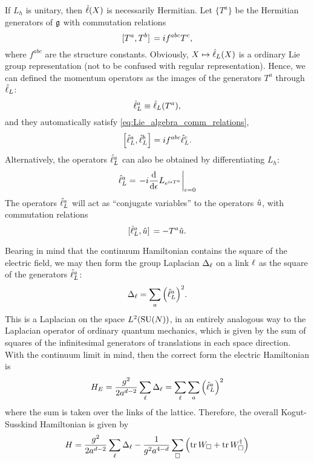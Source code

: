 If $L_h$ is unitary, then $\hat{\ell}(X)$ is necessarily Hermitian.
Let $\{T^a\}$ be the Hermitian generators of $\mathfrak{g}$ with commutation relations
\begin{equation}
    \comm*{T^a}{T^b} = i f^{abc} T^c,
    \label{eq:Lie_algebra_comm_relations}
\end{equation}
where $f^{abc}$ are the structure constants.
Obviously, $X \mapsto \hat{\ell}_L(X)$ is a ordinary Lie group representation (not to be confused with regular representation).
Hence, we can defined the momentum operators as the images of the generators $T^a$ through $\hat{\ell}_L$:
\begin{equation}
    \hat{\ell}^a_L \equiv \hat{\ell}_L(T^a),
\end{equation}
and they automatically satisfy \eqref{eq:Lie_algebra_comm_relations},
\begin{equation}
    \comm{\generator^a_L}{\generator^b_L} = i f^{abc} \generator^c_L.
\end{equation}
Alternatively, the operators $\hat{\ell}^a_L$ can also be obtained by differentiating $L_h$:
\begin{equation}
    \generator^a_L = \eval{-i \dv{\epsilon} L_{e^{i \epsilon T^a}}}_{\epsilon=0}
\end{equation}
The operators $\hat{\ell}^a_L$ will act as ``conjugate variables'' to the operators $\hat{u}$, with commutation relations
\begin{equation}
    \comm*{\generator_L^a}{\transport} = -T^a \transport.
\end{equation}

Bearing in mind that the continuum Hamiltonian contains the square of the electric field, we may then form the group Laplacian $\Delta_{\ell}$ on a link $\ell$ as the square of the generators $\hat{\ell}^a_L$:
\begin{equation}
    \Delta_{\ell} = \sum_{a} \qty( \hat{\ell}^a_L )^2.
\end{equation}
This is a Laplacian on the space $L^2(\text{SU}(N))$, in an entirely analogous way to the Laplacian operator of ordinary quantum mechanics, which is given by the sum of squares of the infinitesimal generators of translations in each space direction.
With the continuum limit in mind, then the correct form the electric Hamiltonian is
\begin{equation}
    H_E =
    \frac{g^2}{2 a^{d-2}} \sum_{\ell} \Delta_{\ell} =
    \sum_{\ell} \sum_{a} \qty( \hat{\ell}_L^a )^2
\end{equation}
where the sum is taken over the links of the lattice.
Therefore, the overall Kogut-Susskind Hamiltonian is given by
\begin{equation}
    H =
    \frac{g^2}{2 a^{d-2}} \sum_{\ell} \Delta_{\ell}
    - \frac{1}{g^2 a^{4-d}} \sum_{\square} \qty(
        \tr W_{\square} + \tr W_{\square}^{\dagger}
    )
\end{equation}




